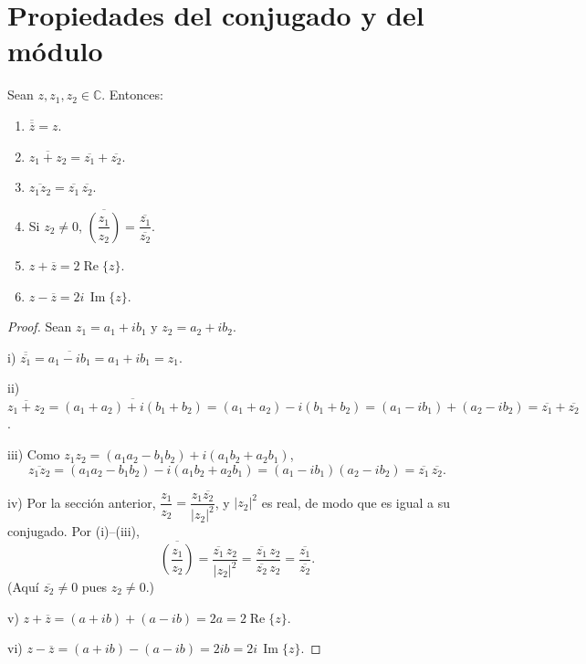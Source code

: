 \documentclass[12pt,a4paper]{book}
\DeclareMathOperator{\Real}{Re}
\DeclareMathOperator{\Imag}{Im}
\begin{document}
  \section{Propiedades del conjugado y del módulo}

  \begin{proposicion}
    Sean $z,z_1,z_2\in\mathbb{C}$. Entonces:
    \begin{enumerate}[label=\roman*)]
      \item $\overline{\overline{z}}=z$.
      \item $\overline{z_1+z_2}=\overline{z_1}+\overline{z_2}$.
      \item $\overline{z_1z_2}=\overline{z_1}\,\overline{z_2}$.
      \item Si $z_2\neq 0$, $\overline{\left(\dfrac{z_1}{z_2}\right)}=\dfrac{\overline{z_1}}{\overline{z_2}}$.
      \item $z+\overline{z}=2\Real\{z\}$.
      \item $z-\overline{z}=2i\,\Imag\{z\}$.
    \end{enumerate}
  \end{proposicion}

  \begin{proof}
    Sean $z_1=a_1+ib_1$ y $z_2=a_2+ib_2$.

    i) $\overline{\overline{z_1}}=\overline{a_1-ib_1}=a_1+ib_1=z_1$.

    ii) $\overline{z_1+z_2}=\overline{(a_1+a_2)+i(b_1+b_2)}=(a_1+a_2)-i(b_1+b_2)=(a_1-ib_1)+(a_2-ib_2)=\overline{z_1}+\overline{z_2}$.

    iii) Como $z_1z_2=(a_1a_2-b_1b_2)+i(a_1b_2+a_2b_1)$,
    \begin{equation*}
      \overline{z_1z_2}=(a_1a_2-b_1b_2)-i(a_1b_2+a_2b_1)=(a_1-ib_1)(a_2-ib_2)=\overline{z_1}\,\overline{z_2}.
    \end{equation*}

    iv) Por la sección anterior, $\dfrac{z_1}{z_2}=\dfrac{z_1\overline{z_2}}{|z_2|^2}$, y $|z_2|^2$ es real, de modo que es igual a su conjugado. Por (i)--(iii),
    \begin{equation*}
      \overline{\left(\frac{z_1}{z_2}\right)}=\frac{\overline{z_1}\,z_2}{|z_2|^2}=\frac{\overline{z_1}\,z_2}{\overline{z_2}\,z_2}=\frac{\overline{z_1}}{\overline{z_2}}.
    \end{equation*}
    (Aquí $\overline{z_2}\neq 0$ pues $z_2\neq 0$.)

    v) $z+\overline{z}=(a+ib)+(a-ib)=2a=2\Real\{z\}$.

    vi) $z-\overline{z}=(a+ib)-(a-ib)=2ib=2i\,\Imag\{z\}$.
  \end{proof}
\end{document}
